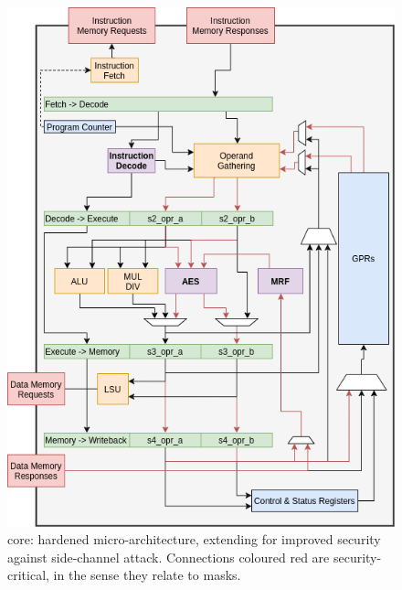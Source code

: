 \begin{figure}[!h]
\centering
\includegraphics[scale=0.45,angle=90]{diagrams/scarv-cpu-uarch-sca.png}
\caption{
   core: hardened micro-architecture, 
  extending  for improved security against side-channel attack.
  Connections coloured red are security-critical, in the sense they relate to masks.
}
\label{fig:core:2:secure}
\end{figure}

